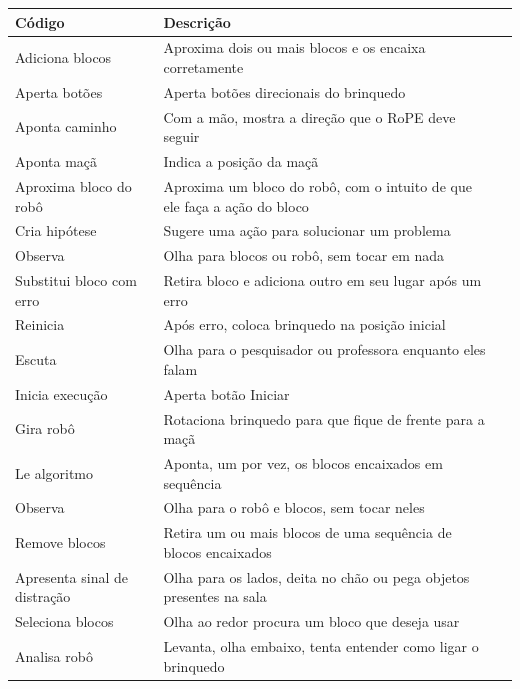 \begin{quadro}[!h]
    \begin{table_env}
    \caption{}
     \label{quadro:codigos}
     \begin{tabular}{@{}l m{} c@{}}
        \toprule
        \textbf{Código} & \textbf{Descrição}  \\ \midrule
        Adiciona blocos & Aproxima dois ou mais blocos e os encaixa corretamente \\ \hline
        Aperta botões & Aperta botões direcionais do brinquedo \\ \hline
        Aponta caminho & Com a mão, mostra a direção que o RoPE deve seguir \\ \hline
        Aponta maçã & Indica a posição da maçã \\ \hline
        Aproxima bloco do robô & Aproxima um bloco do robô, com o intuito de que ele faça a ação do bloco \\ \hline
        Cria hipótese & Sugere uma ação para solucionar um problema \\ \hline
        Observa & Olha para blocos ou robô, sem tocar em nada \\ \hline
        Substitui bloco com erro & Retira bloco e adiciona outro em seu lugar após um erro \\ \hline
        Reinicia & Após erro, coloca brinquedo na posição inicial \\ \hline %
        Escuta & Olha para o pesquisador ou professora enquanto eles falam \\ \hline
        Inicia execução & Aperta botão Iniciar  \\ \hline
        Gira robô & Rotaciona brinquedo para que fique de frente para a maçã \\ \hline
        Le algoritmo & Aponta, um por vez, os blocos encaixados em sequência \\ \hline
        Observa & Olha para o robô e blocos, sem tocar neles \\ \hline
        Remove blocos & Retira um ou mais blocos de uma sequência de blocos encaixados \\ \hline
        Apresenta sinal de distração & Olha para os lados, deita no chão ou pega objetos presentes na sala \\ \hline
        Seleciona blocos & Olha ao redor procura um bloco que deseja usar \\ \hline
        Analisa robô & Levanta, olha embaixo, tenta entender como ligar o brinquedo \\ \hline
        

\end{tabular}
\end{table_env}
\end{quadro}
